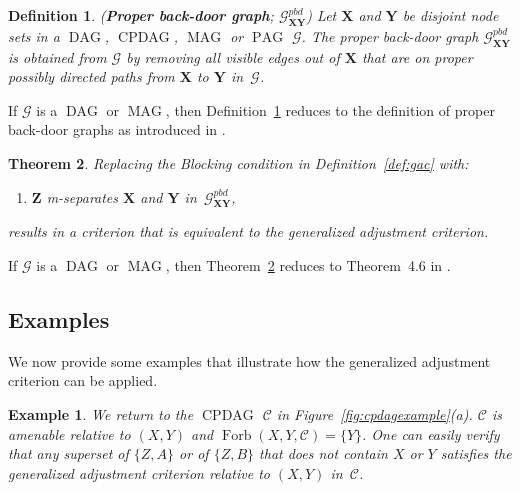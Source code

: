 \documentclass[11pt,a4paper]{article}
\newtheorem{definition}{Definition}
\newtheorem{theorem}[definition]{Theorem}
\newtheorem{example}{Example}
\DeclareMathOperator{\CPDAG}{CPDAG}
\DeclareMathOperator{\DAG}{DAG}
\DeclareMathOperator{\MAG}{MAG}
\DeclareMathOperator{\PAG}{PAG}
\DeclareMathOperator{\Forbi}{Forb}
\newcommand{\g}[1][G]{\mathcal{#1}}
\newcommand{\gpbd}[2][G]{\mathcal{#1}_{\mathbf{#2}}^{pbd}}
\newcommand{\f}[2][X,Y]{\Forbi(#1,#2)}
\begin{document}
\begin{definition}(\textbf{Proper back-door graph}; $\gpbd{\mathbf{XY}}$)
  Let $\mathbf{X}$ and $\mathbf{Y}$ be disjoint node sets in a $\DAG$, $\CPDAG$, $\MAG$ or $\PAG$ $\g$. The proper back-door graph $\gpbd{\mathbf{XY}}$ is obtained from $\g$ by removing all visible edges out of $\mathbf{X}$ that are on proper possibly directed paths from $\mathbf{X}$ to $\mathbf{Y}$ in~$\g$.
\label{def:gpbd}
\end{definition}

\noindent{}If $\g$ is a $\DAG$ or $\MAG$, then Definition~\ref{def:gpbd} reduces to the definition of proper back-door graphs as introduced in \cite{vanconstructing}.

\begin{theorem}
Replacing the Blocking condition in Definition~\ref{def:gac} with:

\begin{enumerate}[label = (\roman*), leftmargin=0.5cm,align=left]
\item[({\bfseries Separation})] \label{cond2prime} $\mathbf{Z}$ m-separates $\mathbf{X}$ and $\mathbf{Y}$ in~$\gpbd{\mathbf{XY}}$,
\end{enumerate}
results in a criterion that is equivalent to the generalized adjustment criterion.
\label{theorem:gac-alt}
\end{theorem}

\noindent{}If $\g$ is a $\DAG$ or $\MAG$, then Theorem~\ref{theorem:gac-alt} reduces to Theorem~4.6 in \cite{vanconstructing}.

\subsection{Examples} \label{subsec:examples1}

We now provide some examples that illustrate how the generalized adjustment criterion can be applied.

\begin{example}
   We return to the $\CPDAG$ $\g[C]$ in Figure~\ref{fig:cpdagexample}(a). $\g[C]$ is amenable relative to $(X,Y)$ and $\f{\g[C]} = \{ Y \}$.
One can easily verify that any superset of $\{Z,A\}$ or of $\{Z,B\}$ that does not contain $X$ or $Y$ satisfies the generalized adjustment criterion relative to $(X,Y)$ in~$\g[C]$.
  \label{ex:everything-works}
\end{example}
\end{document}
